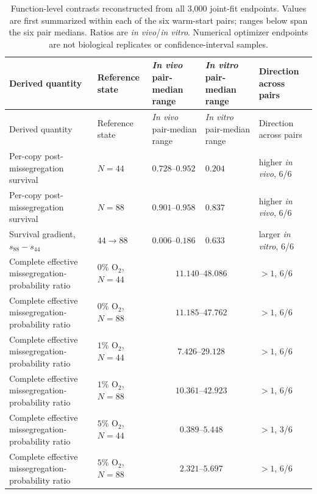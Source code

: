 \begingroup
\small
\setlength{\tabcolsep}{4pt}
\begin{longtable}{@{}p{}p{}p{}p{}p{}@{}}
\caption{Function-level contrasts reconstructed from all 3,000 joint-fit endpoints. Values are first summarized within each of the six warm-start pairs; ranges below span the six pair medians. Ratios are \textit{in vivo}/\textit{in vitro}. Numerical optimizer endpoints are not biological replicates or confidence-interval samples.}
\label{tab:joint_function_contrasts}\\
\toprule
Derived quantity & Reference state & \textit{In vivo} pair-median range & \textit{In vitro} pair-median range & Direction across pairs \\
\midrule
\endfirsthead
\toprule
Derived quantity & Reference state & \textit{In vivo} pair-median range & \textit{In vitro} pair-median range & Direction across pairs \\
\midrule
\endhead
Per-copy post-missegregation survival & $N=44$ & $0.728$--$0.952$ & $0.204$ & higher \textit{in vivo}, 6/6 \\
Per-copy post-missegregation survival & $N=88$ & $0.901$--$0.958$ & $0.837$ & higher \textit{in vivo}, 6/6 \\
Survival gradient, $s_{88}-s_{44}$ & $44\rightarrow88$ & $0.006$--$0.186$ & $0.633$ & larger \textit{in vitro}, 6/6 \\
\midrule
Complete effective missegregation-probability ratio & $0\%$ O$_2$, $N=44$ & \multicolumn{2}{c}{$11.140$--$48.086$} & $>1$, 6/6 \\
Complete effective missegregation-probability ratio & $0\%$ O$_2$, $N=88$ & \multicolumn{2}{c}{$11.185$--$47.762$} & $>1$, 6/6 \\
Complete effective missegregation-probability ratio & $1\%$ O$_2$, $N=44$ & \multicolumn{2}{c}{$7.426$--$29.128$} & $>1$, 6/6 \\
Complete effective missegregation-probability ratio & $1\%$ O$_2$, $N=88$ & \multicolumn{2}{c}{$10.361$--$42.923$} & $>1$, 6/6 \\
Complete effective missegregation-probability ratio & $5\%$ O$_2$, $N=44$ & \multicolumn{2}{c}{$0.389$--$5.448$} & $>1$, 3/6 \\
Complete effective missegregation-probability ratio & $5\%$ O$_2$, $N=88$ & \multicolumn{2}{c}{$2.321$--$5.697$} & $>1$, 6/6 \\
\bottomrule
\end{longtable}
\endgroup
